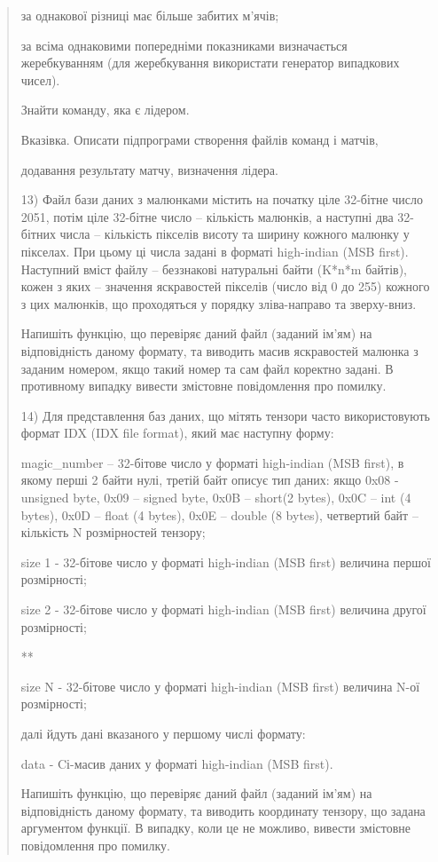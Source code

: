 \documentclass[]{article}
\begin{document}
\begin{quote}
за однакової різниці має більше забитих м'ячів;

за всіма однаковими попередніми показниками визначається жеребкуванням
(для жеребкування використати генератор випадкових чисел).

Знайти команду, яка є лідером.

Вказівка. Описати підпрограми створення файлів команд і матчів,

додавання результату матчу, визначення лідера.

13) Файл бази даних з малюнками містить на початку ціле 32-бітне число
2051, потім ціле 32-бітне число -- кількість малюнків, а наступні два
32-бітних числа -- кількість пікселів висоту та ширину кожного малюнку у
пікселах. При цьому ці числа задані в форматі high-indian (MSB first).
Наступний вміст файлу -- беззнакові натуральні байти (K*n*m байтів),
кожен з яких -- значення яскравостей пікселів (число від 0 до 255)
кожного з цих малюнків, що проходяться у порядку зліва-направо та
зверху-вниз.

Напишіть функцію, що перевіряє даний файл (заданий ім'ям) на
відповідність даному формату, та виводить масив яскравостей малюнка з
заданим номером, якщо такий номер та сам файл коректно задані. В
противному випадку вивести змістовне повідомлення про помилку.

14) Для представлення баз даних, що мітять тензори часто використовують
формат IDX (IDX file format), який має наступну форму:

magic\_number -- 32-бітове число у форматі high-indian (MSB first), в
якому перші 2 байти нулі, третій байт описує тип даних: якщо 0x08
-unsigned byte, 0x09 -- signed byte, 0x0B -- short(2 bytes), 0x0C -- int
(4 bytes), 0x0D -- float (4 bytes), 0x0E -- double (8 bytes), четвертий
байт -- кількість N розмірностей тензору;

size 1 - 32-бітове число у форматі high-indian (MSB first) величина
першої розмірності;

size 2 - 32-бітове число у форматі high-indian (MSB first) величина
другої розмірності;

**

size N - 32-бітове число у форматі high-indian (MSB first) величина N-ої
розмірності;

далі йдуть дані вказаного у першому числі формату:

data - Cі-масив даних у форматі high-indian (MSB first).

Напишіть функцію, що перевіряє даний файл (заданий ім'ям) на
відповідність даному формату, та виводить координату тензору, що задана
аргументом функції. В випадку, коли це не можливо, вивести змістовне
повідомлення про помилку.
\end{quote}
\end{document}
